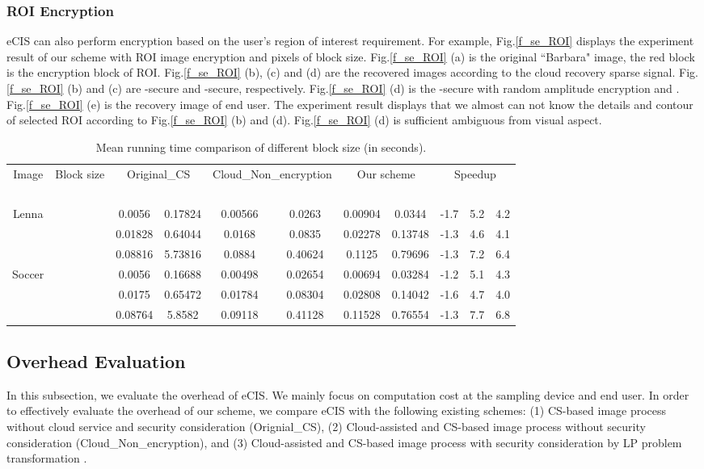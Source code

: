 \documentclass[conference]{IEEEtran}
\begin{document}
\subsubsection{ROI Encryption}
eCIS can also  perform  encryption based on the user's  region of interest requirement. For example, Fig.\ref{f_se_ROI} displays the experiment result of our scheme with ROI image encryption and  pixels of  block size. Fig.\ref{f_se_ROI} (a) is the original ``Barbara" image, the red block is the encryption block of ROI. Fig.\ref{f_se_ROI} (b), (c) and (d) are the recovered  images according to the cloud recovery sparse signal. Fig.\ref{f_se_ROI} (b) and (c) are -secure and -secure, respectively. Fig.\ref{f_se_ROI} (d) is the -secure with random amplitude encryption and . Fig.\ref{f_se_ROI} (e) is the recovery image of end user. The experiment result displays that we almost can not know the details and contour of selected ROI according to Fig.\ref{f_se_ROI} (b) and (d). Fig.\ref{f_se_ROI} (d) is sufficient  ambiguous from visual aspect.
\begin{table*}
\begin{center}
\caption{Mean running time comparison of different block size (in seconds).}\label{t_run_time_comp}
\begin{tabular}[t]{|c|c|c|c|c|c|c|c|c|c|c|}
\hline
\multirow{2}{*}{Image} & \multirow{2}{*}{Block size} & \multicolumn{2}{c|}{Original\_CS} & \multicolumn{2}{c|}{Cloud\_Non\_encryption} & \multicolumn{2}{c|}{Our scheme} & \multicolumn{3}{c|}{Speedup}\tabularnewline
\cline{3-11}
 &  &  &  & ~~~ ~~ &  &  &  &  &  &   \tabularnewline
\hline
\multirow{3}{*}{Lenna} &  & 0.0056  & 0.17824  & 0.00566  & 0.0263  & 0.00904  & 0.0344  & -1.7 & 5.2 & 4.2\tabularnewline
\cline{2-11}
 &  & 0.01828  & 0.64044  & 0.0168  & 0.0835  & 0.02278  & 0.13748  & -1.3 & 4.6 & 4.1\tabularnewline
\cline{2-11}
 &  & 0.08816  & 5.73816  & 0.0884  & 0.40624  & 0.1125  & 0.79696  & -1.3 & 7.2 & 6.4\tabularnewline
\hline
\multirow{3}{*}{Soccer} &  & 0.0056 & 0.16688 & 0.00498  & 0.02654  & 0.00694  & 0.03284  & -1.2 & 5.1 & 4.3\tabularnewline
\cline{2-11}
 &  & 0.0175  & 0.65472  & 0.01784  & 0.08304  & 0.02808  & 0.14042  & -1.6 & 4.7 & 4.0\tabularnewline
\cline{2-11}
 &  & 0.08764  & 5.8582  & 0.09118  & 0.41128  & 0.11528  & 0.76554  & -1.3 & 7.7 & 6.8\tabularnewline
\hline
\end{tabular}
\end{center}
\end{table*}

\subsection{Overhead Evaluation}
In this subsection, we evaluate the overhead of eCIS. We mainly focus on computation cost at the sampling device and end user.  In order to effectively evaluate the overhead of our scheme, we compare eCIS with the following existing schemes:
(1) CS-based image process without cloud service and  security consideration (Orignial\_CS),
(2) Cloud-assisted and CS-based image process without security consideration (Cloud\_Non\_encryption),
and (3) Cloud-assisted and CS-based image process with security consideration by LP problem transformation  \cite{wang2014privacy}.
\end{document}
